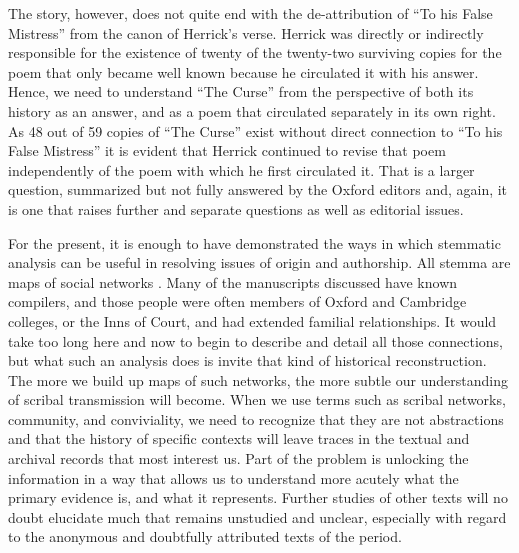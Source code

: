 \begin{paper}
The story, however, does not quite end with the de-attribution of ``To
his False Mistress'' from the canon of Herrick's verse. Herrick was
directly or indirectly responsible for the existence of twenty of the
twenty-two surviving copies for the poem that only became well known
because he circulated it with his answer. Hence, we need to understand
``The Curse'' from the perspective of both its history as an answer, and
as a poem that circulated separately in its own right. As 48 out of 59
copies of ``The Curse'' exist without direct connection to ``To his False
Mistress'' it is evident that Herrick continued to revise that poem
independently of the poem with which he first circulated it. That is a
larger question, summarized but not fully answered by the Oxford editors
and, again, it is one that raises further and separate questions as well as
editorial issues.

For the present, it is enough to have demonstrated the ways in which
stemmatic analysis can be useful in resolving issues of origin and
authorship. All stemma are maps of social networks \citep{bland_stemmatics_2013}. Many of
the manuscripts discussed have known compilers, and those people were
often members of Oxford and Cambridge colleges, or the Inns of Court,
and had extended familial relationships. It would take too long here and
now to begin to describe and detail all those connections, but what such
an analysis does is invite that kind of historical reconstruction. The
more we build up maps of such networks, the more subtle our
understanding of scribal transmission will become. When we use terms
such as scribal networks, community, and conviviality, we need to
recognize that they are not abstractions and that the history of
specific contexts will leave traces in the textual and archival records
that most interest us. Part of the problem is unlocking the information
in a way that allows us to understand more acutely what the primary
evidence is, and what it represents. Further studies of other texts will
no doubt elucidate much that remains unstudied and unclear, especially
with regard to the anonymous and doubtfully attributed texts of the
period.

\begin{flushleft}
  
\end{flushleft}
\end{paper}